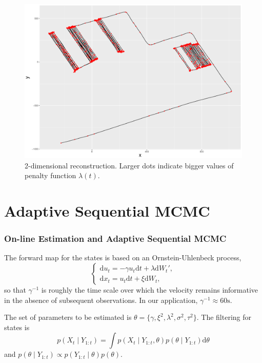 \documentclass{beamer}
\begin{document}
\begin{frame}

\begin{figure}
\centering
\includegraphics[width=0.9\linewidth]{../Chapters/02TractorSplineTheory/plot/ggplot/ggRealdataCompleteXY.pdf}
\caption{2-dimensional reconstruction. Larger dots indicate bigger values of penalty function $\lambda(t)$.}
\end{figure}

\end{frame}


\section{Adaptive Sequential MCMC}

\begin{frame}
\frametitle{On-line Estimation and Adaptive Sequential MCMC}


The forward map for the states is based on an Ornstein-Uhlenbeck process,
\begin{equation}\label{OUprocess}
\begin{cases}
\text{d}u_t = -\gamma u_t \text{d}t+ \lambda \text{d}W_t',\\
\text{d}x_t = u_t \text{d}t+\xi \text{d}W_t,
\end{cases}
\end{equation}
so that $\gamma^{-1}$ is roughly the time scale over which the velocity remains informative in the absence of subsequent observations. In our application, $\gamma^{-1}\approx 60\text{s}$.

The set of parameters to be estimated is $\theta=\{\gamma,\xi^2,\lambda^2,\sigma^2,\tau^2 \}$. The filtering for states is
\begin{equation}\label{filterX}
p(X_t\mid Y_{1:t}) = \int p(X_t\mid Y_{1:t} ,\theta)p(\theta \mid Y_{1:t})\text{d}\theta
\end{equation}
and $p(\theta\mid Y_{1:t}) \propto p(Y_{1:t}\mid \theta)p(\theta)$.

\end{frame}
\end{document}
